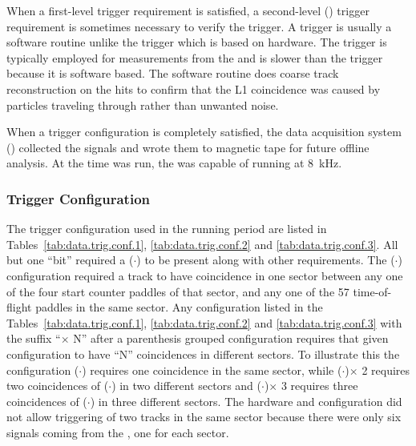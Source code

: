 	When a first-level trigger requirement is satisfied, a second-level () trigger requirement is sometimes necessary to verify the  trigger. A  trigger is usually a software routine unlike the  trigger which is based on hardware. The  trigger is typically employed for measurements from the  and is slower than the  trigger because it is software based. The software routine does coarse track reconstruction on the  hits to confirm that the L1 coincidence was caused by particles traveling through \clas rather than unwanted noise.
	
	When a trigger configuration is completely satisfied, the data acquisition system () collected the signals and wrote them to magnetic tape for future offline analysis. At the time  was run, the  was capable of running at 8~kHz.
	
	\subsubsection{ Trigger Configuration} \label{sec:data.trig}
	The trigger configuration used in the  running period are listed in Tables~\ref{tab:data.trig.conf.1}, \ref{tab:data.trig.conf.2} and \ref{tab:data.trig.conf.3}. All but one ``bit'' required a ($\cdot$) to be present along with other requirements. The ($\cdot$) configuration required a track to have coincidence in one sector between any one of the four start counter paddles of that sector, and any one of the 57 time-of-flight paddles in the same sector. Any configuration listed in the Tables~\ref{tab:data.trig.conf.1}, \ref{tab:data.trig.conf.2} and \ref{tab:data.trig.conf.3} with the suffix ``$\times$ N'' after a parenthesis grouped configuration requires that given configuration to have ``N'' coincidences in different sectors. To illustrate this the configuration ($\cdot$) requires one coincidence in the same sector, while ($\cdot$)$\times$ 2 requires two coincidences of ($\cdot$) in two different sectors and ($\cdot$)$\times$ 3 requires three coincidences of ($\cdot$) in three different sectors. The hardware and configuration did not allow triggering of two tracks in the same sector because there were only six signals coming from the , one for each sector. 
	
